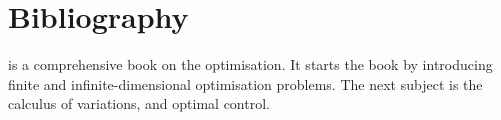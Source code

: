 
\chapter{Bibliography}
\minitoc

\begin{description}
	\item \citep{Liberzon2012} is a comprehensive book on the optimisation. It starts the book by introducing finite and infinite-dimensional optimisation problems. The next subject is the calculus of variations, and optimal control.
\end{description}


\clearpage
\printbibliography[segment=\therefsegment,heading=subbibintoc]